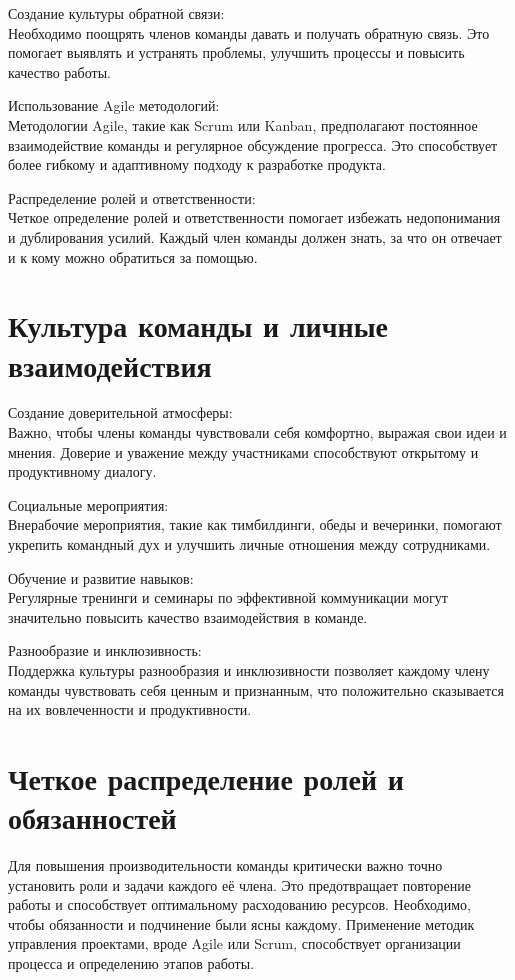     Создание культуры обратной связи: \\
    Необходимо поощрять членов команды давать и получать обратную связь. Это помогает выявлять и устранять проблемы, улучшить процессы и повысить качество работы.
    
    Использование Agile методологий: \\
    Методологии Agile, такие как Scrum или Kanban, предполагают постоянное взаимодействие команды и регулярное обсуждение прогресса. Это способствует более гибкому и адаптивному подходу к разработке продукта.
    
    Распределение ролей и ответственности: \\
    Четкое определение ролей и ответственности помогает избежать недопонимания и дублирования усилий. Каждый член команды должен знать, за что он отвечает и к кому можно обратиться за помощью.

    \section{Культура команды и личные взаимодействия}
    Создание доверительной атмосферы: \\
    Важно, чтобы члены команды чувствовали себя комфортно, выражая свои идеи и мнения. Доверие и уважение между участниками способствуют открытому и продуктивному диалогу.
    
    Социальные мероприятия: \\
    Внерабочие мероприятия, такие как тимбилдинги, обеды и вечеринки, помогают укрепить командный дух и улучшить личные отношения между сотрудниками.
    
    Обучение и развитие навыков: \\
    Регулярные тренинги и семинары по эффективной коммуникации могут значительно повысить качество взаимодействия в команде.
    
    Разнообразие и инклюзивность: \\
    Поддержка культуры разнообразия и инклюзивности позволяет каждому члену команды чувствовать себя ценным и признанным, что положительно сказывается на их вовлеченности и продуктивности.

    \section{Четкое распределение ролей и обязанностей}
    Для повышения производительности команды критически важно точно установить роли и задачи каждого её члена. Это предотвращает повторение работы и способствует оптимальному расходованию ресурсов. Необходимо, чтобы обязанности и подчинение были ясны каждому. Применение методик управления проектами, вроде Agile или Scrum, способствует организации процесса и определению этапов работы.

